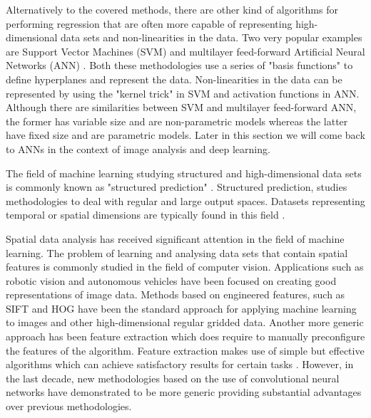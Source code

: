 \bigskip
\bigskip


\bigskip
\bigskip

Alternatively to the covered methods, there are other kind of algorithms for performing regression that are often more capable of representing high-dimensional data sets and non-linearities in the data. Two very popular examples are Support Vector Machines (SVM) \citep{hearst1998support} and multilayer feed-forward Artificial Neural Networks (ANN) \citep{hornik1989multilayer}. Both these methodologies use a series of "basis functions" to define hyperplanes and represent the data. Non-linearities in the data can be represented by using the "kernel trick" \citep{mika1999fisher} in SVM and activation functions in ANN. Although there are similarities between SVM and multilayer feed-forward ANN, the former has variable size and are non-parametric models whereas the latter have fixed size and are parametric models. Later in this section we will come back to ANNs in the context of image analysis and deep learning.

\medskip

The field of machine learning studying structured and high-dimensional data sets is commonly known as "structured prediction" \citep{taskar2005learning}. Structured prediction, studies methodologies to deal with regular and large output spaces. Datasets representing temporal or spatial dimensions are typically found in this field \citep{gupta2010estimating,tran2012max}.

\medskip

Spatial data analysis has received significant attention in the field of machine learning. The problem of learning and analysing data sets that contain spatial features is commonly studied in the field of computer vision. Applications such as robotic vision and autonomous vehicles have been focused on creating good representations of image data. Methods based on engineered features, such as SIFT \citep{lowe2004distinctive} and HOG \citep{dalal2005histograms} have been the standard approach for applying machine learning to images and other high-dimensional regular gridded data. Another more generic approach has been feature extraction \citep{guyon2006introduction} which does require to manually preconfigure the features of the algorithm. Feature extraction makes use of simple but effective algorithms which can achieve satisfactory results for certain tasks \citep{blum1997selection}. However, in the last decade, new methodologies based on the use of convolutional neural networks have demonstrated to be more generic providing substantial advantages over previous methodologies. 

